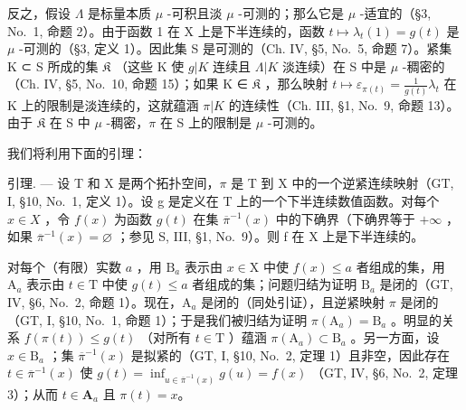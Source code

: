 反之，假设 \(\Lambda\) 是标量本质 \(\mu\) -可积且淡 \(\mu\) -可测的；那么它是 \(\mu\) -适宜的（§3, No.~1, 命题 2）。由于函数 1 在 X 上是下半连续的，函数 \(t \mapsto \lambda_t(1) = g(t)\) 是 \(\mu\) -可测的（§3, 定义 1）。因此集 S 是可测的（Ch. IV, §5, No.~5, 命题 7）。紧集 K ⊂ S 所成的集 \(\mathfrak{K}\) （这些 K 使 \(g|K\) 连续且 \(\Lambda|K\) 淡连续）在 S 中是 \(\mu\) -稠密的（Ch. IV, §5, No.~10, 命题 15）；如果 K ∈ \(\mathfrak{K}\) ，那么映射 \(t \mapsto \varepsilon_{\pi(t)} = \frac{1}{g(t)} \lambda_t\) 在 K 上的限制是淡连续的，这就蕴涵 \(\pi|K\) 的连续性（Ch. III, §1, No.~9, 命题 13）。由于 \(\mathfrak{K}\) 在 S 中 \(\mu\) -稠密，\(\pi\) 在 S 上的限制是 \(\mu\) -可测的。

我们将利用下面的引理：

引理. --- 设 T 和 X 是两个拓扑空间，\(\pi\) 是 T 到 X 中的一个逆紧连续映射（GT, I, §10, No.~1, 定义 1）。设 g 是定义在 T 上的一个下半连续数值函数。对每个 \(x \in X\) ，令 \(f(x)\) 为函数 \(g(t)\) 在集 \(\overline{\pi}^{-1}(x)\) 中的下确界（下确界等于 \(+\infty\) ，如果 \(\overline{\pi}^{-1}(x) = \varnothing\) ；参见 S, III, §1, No.~9）。则 f 在 X 上是下半连续的。

对每个（有限）实数 \(a\) ，用 \(\mathrm{B}_a\) 表示由 \(x \in \mathrm{X}\) 中使 \(f(x) \leqslant a\) 者组成的集，用 \(\mathrm{A}_a\) 表示由 \(t \in \mathrm{T}\) 中使 \(g(t) \leqslant a\) 者组成的集；问题归结为证明 \(\mathrm{B}_a\) 是闭的（GT, IV, §6, No.~2, 命题 1）。现在，\(\mathrm{A}_a\) 是闭的（同处引证），且逆紧映射 \(\pi\) 是闭的（GT, I, §10, No.~1, 命题 1）；于是我们被归结为证明 \(\pi(\mathrm{A}_a) = \mathrm{B}_a\) 。明显的关系 \(f(\pi(t)) \leqslant g(t)\) （对所有 \(t \in \mathrm{T}\) ）蕴涵 \(\pi(\mathrm{A}_a) \subset \mathrm{B}_a\) 。另一方面，设 \(x \in \mathrm{B}_a\) ；集 \(\overline{\pi}^{-1}(x)\) 是拟紧的（GT, I, §10, No.~2, 定理 1）且非空，因此存在 \(t \in \overline{\pi}^{-1}(x)\) 使 \(g(t) = \inf_{u\in \overline{\pi}^{-1} (x)}g(u) = f(x)\) （GT, IV, §6, No.~2, 定理 3）；从而 \(t\in \mathbf{A}_a\) 且 \(\pi (t) = x\)。

